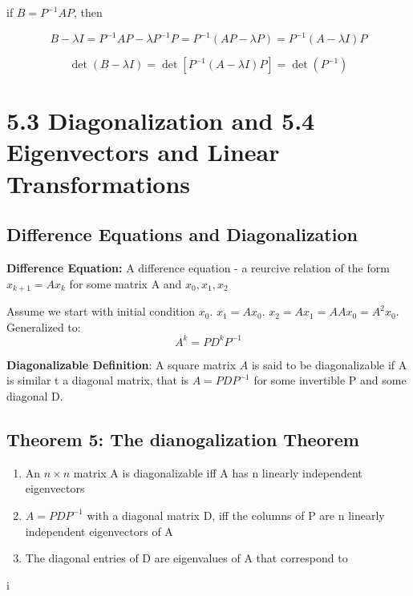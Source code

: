 if $B=P^{-1}AP$, then

\begin{equation}
	\label{}
	B-\lambda I = P^{-1}AP-\lambda P^{-1}P=P^{-1}(AP-\lambda P)=P^{-1}(A-\lambda I)P
\end{equation}


\begin{equation}
	\label{}
	\det(B-\lambda I)=\det[P^{-1}(A-\lambda I)P]=\det(P^{-1})	
\end{equation}



\section{5.3 Diagonalization and 5.4 Eigenvectors and Linear Transformations}







\subsection{Difference Equations and Diagonalization}


\textbf{Difference Equation:} A difference equation - a reurcive relation of the form $x_{k+1}=Ax_{k}$ for some matrix A and $x_{0},x_{1},x_{2}$


Assume we start with initial condition $x_{0}$. $x_{1}=Ax_{0}$. $x_{2}=Ax_{1}=AAx_{0}=A^{2}x_{0}$. Generalized to:
\begin{equation}
	\label{}
A^{k}=PD^{k}P^{-1}	
\end{equation}

\textbf{Diagonalizable Definition}: A square matrix $A$ is said to be diagonalizable if A is similar t a diagonal matrix, that is $A=PDP^{-1}$ for some invertible P and some diagonal D.

\subsection{Theorem 5: The dianogalization Theorem}
\begin{enumerate}
	\item An $n\times n$ matrix A is diagonalizable iff A has n linearly independent eigenvectors
	\item $A=PDP^{-1}$ with a diagonal matrix D, iff the columns of P are n linearly independent eigenvectors of A
	\item The diagonal entries of D are eigenvalues of A that correspond to 
\end{enumerate}
i
